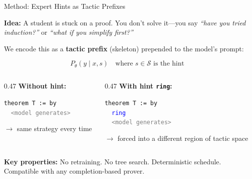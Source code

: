 \documentclass[aspectratio=169]{beamer}
\begin{document}
\begin{frame}{Method: Expert Hints as Tactic Prefixes}

\textbf{Idea:} A student is stuck on a proof. You don't solve it---you say \emph{``have you tried induction?''} or \emph{``what if you simplify first?''}

\vspace{0.5em}
We encode this as a \textbf{tactic prefix} (skeleton) prepended to the model's prompt:

$$P_\theta(y \mid x, s) \quad \text{where } s \in \mathcal{S} \text{ is the hint}$$

\vspace{0.3em}
\begin{columns}[T]
\begin{column}{0.47\textwidth}
\textbf{Without hint:}
\begin{center}
\texttt{theorem T := by}\\
\texttt{~~\textcolor{gray}{<model generates>}}
\end{center}
$\to$ same strategy every time
\end{column}
\begin{column}{0.47\textwidth}
\textbf{With hint \texttt{ring}:}
\begin{center}
\texttt{theorem T := by}\\
\texttt{~~\textcolor{blue}{ring}}\\
\texttt{~~\textcolor{gray}{<model generates>}}
\end{center}
$\to$ forced into a different region of tactic space
\end{column}
\end{columns}

\vspace{0.5em}
\textbf{Key properties:} No retraining. No tree search. Deterministic schedule. Compatible with any completion-based prover.
\end{frame}
\end{document}
